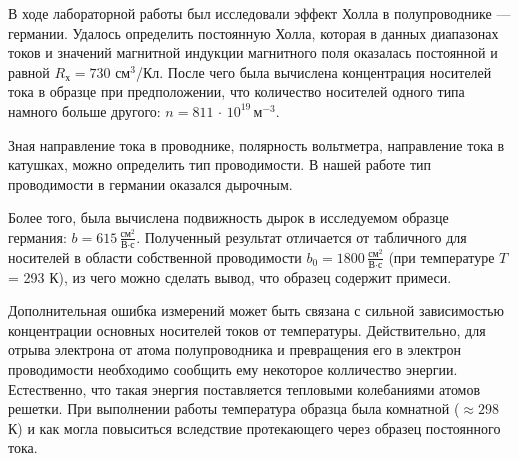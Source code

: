 \documentclass[a4paper]{article}
\theoremstyle{definition}
\theoremstyle{remark}
\begin{document}
    В ходе лабораторной работы был исследовали эффект Холла в полупроводнике --- германии. Удалось определить постоянную Холла, которая в данных диапазонах токов и значений магнитной индукции магнитного поля оказалась постоянной и равной $R_\text{х} = 730$ см$^3$/Кл. После чего была вычислена концентрация носителей тока в образце при предположении, что количество носителей одного типа намного больше другого: $n = 811\, \cdot \, 10^{19}\,\text{м}^{-3}$. \medskip
    
    Зная направление тока в проводнике, полярность вольтметра, направление тока в катушках, можно определить тип проводимости. В нашей работе тип проводимости в германии оказался дырочным. \medskip
	
	Более того, была вычислена подвижность дырок в исследуемом образце германия: $b = 615\, \frac{\text{см}^2}{\text{В}\cdot\text{с}}$. Полученный результат отличается от табличного для носителей в области собственной проводимости $b_0 = 1800\, \frac{\text{см}^2}{\text{В}\cdot\text{с}}$ (при температуре $T$ = 293 К), из чего можно сделать вывод, что образец содержит примеси. \medskip
    
    Дополнительная ошибка измерений может быть связана с сильной зависимостью концентрации основных носителей токов от температуры. Действительно, для отрыва электрона от атома полупроводника и превращения его в электрон проводимости необходимо сообщить ему некоторое колличество энергии. Естественно, что такая энергия поставляется тепловыми колебаниями атомов решетки. При выполнении работы температура образца была комнатной ($\approx 298$ К) и как могла повыситься вследствие протекающего через образец постоянного тока.
	
\end{document}

